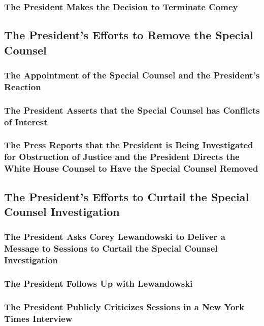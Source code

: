 \subsubsection{The President Makes the Decision to Terminate Comey}

\subsection{The President's Efforts to Remove the Special Counsel}

\subsubsection{The Appointment of the Special Counsel and the President's Reaction}

\subsubsection{The President Asserts that the Special Counsel has Conflicts of Interest}

\subsubsection{The Press Reports that the President is Being Investigated for Obstruction of Justice and the President Directs the White House Counsel to Have the Special Counsel Removed}

\subsection{The President's Efforts to Curtail the Special Counsel Investigation}

\subsubsection{The President Asks Corey Lewandowski to Deliver a Message to Sessions to Curtail the Special Counsel Investigation}

\subsubsection{The President Follows Up with Lewandowski}

\subsubsection{The President Publicly Criticizes Sessions in a New York Times Interview}

